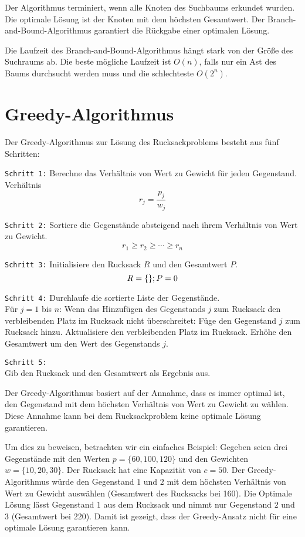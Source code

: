 Der Algorithmus terminiert, wenn alle Knoten des Suchbaums 
erkundet wurden. Die optimale Lösung ist der Knoten mit dem 
höchsten Gesamtwert. Der Branch-and-Bound-Algorithmus 
garantiert die Rückgabe einer optimalen Lösung.

Die Laufzeit des 
Branch-and-Bound-Algorithmus hängt stark von der Größe des 
Suchraums ab. Die beste mögliche Laufzeit ist 
$O(n)$, falls nur ein Ast des Baums durchsucht werden muss und 
die schlechteste $O(2^n)$.\ \cite[vgl.][]{Martello1987}

\section{Greedy-Algorithmus}
Der Greedy-Algorithmus zur Lösung des Rucksackproblems besteht 
aus fünf Schritten:

\texttt{Schritt 1:} Berechne das Verhältnis von Wert zu Gewicht für 
jeden Gegenstand.
Verhältnis \[r_j = \frac{p_j}{w_j}\]

\texttt{Schritt 2:} Sortiere die Gegenstände absteigend nach ihrem 
Verhältnis von Wert zu Gewicht.
\[r_1 \geq r_2 \geq \cdots \geq r_n\]

\texttt{Schritt 3:} Initialisiere den Rucksack $R$ und den Gesamtwert $P$.
\[   \text{$R$} = \{\}; \\
    \text{$P$} = 0 \]

\texttt{Schritt 4:} Durchlaufe die sortierte Liste der Gegenstände.\\
Für $j = 1$ bis $n$: 
Wenn das Hinzufügen des Gegenstands $j$ zum Rucksack den 
verbleibenden Platz im Rucksack nicht überschreitet:
Füge den Gegenstand $j$ zum Rucksack hinzu.
Aktualisiere den verbleibenden Platz im Rucksack.
Erhöhe den Gesamtwert um den Wert des Gegenstands $j$.

\texttt{Schritt 5:} \\Gib den Rucksack und den Gesamtwert als Ergebnis 
aus.

Der Greedy-Algorithmus basiert auf der Annahme, dass es 
immer optimal ist, den Gegenstand mit dem höchsten Verhältnis 
von Wert zu Gewicht zu wählen. Diese Annahme kann bei dem Rucksackproblem
keine optimale Lösung garantieren.

Um dies zu beweisen, betrachten wir ein einfaches Beispiel: 
Gegeben seien drei Gegenstände mit den Werten $p = \{60, 100, 120\}$ 
und den Gewichten $w =\{10, 20, 30\}$. Der Rucksack hat eine Kapazität 
von $c = 50$. Der Greedy-Algorithmus würde den Gegenstand $1$ und $2$ mit 
dem höchsten Verhältnis von Wert zu Gewicht auswählen (Gesamtwert des Rucksacks bei 160). Die Optimale 
Lösung lässt Gegenstand $1$ aus dem Rucksack und nimmt nur Gegenstand $2$ und $3$ (Gesamtwert bei 220).
Damit ist gezeigt, dass der Greedy-Ansatz nicht für eine optimale Lösung 
garantieren kann.

